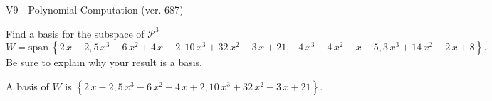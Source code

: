 \begin{exercise}
  \begin{exerciseTitle}V9 - Polynomial Computation (ver. 687)\end{exerciseTitle}
  \begin{exerciseStatement}
    Find a basis for the subspace of \(\mathcal{P}^3\) 
\[W=\mathrm{span}\ \left\{2 \, x - 2 , 5 \, x^{3} - 6 \, x^{2} + 4 \, x + 2 , 10 \, x^{3} + 32 \, x^{2} - 3 \, x + 21 , -4 \, x^{3} - 4 \, x^{2} - x - 5 , 3 \, x^{3} + 14 \, x^{2} - 2 \, x + 8\right\}.\]
 Be sure to explain why your result is a basis.


  \end{exerciseStatement}
  \begin{exerciseAnswer}
   A basis of \(W\) is  \(\left\{2 \, x - 2 , 5 \, x^{3} - 6 \, x^{2} + 4 \, x + 2 , 10 \, x^{3} + 32 \, x^{2} - 3 \, x + 21\right\}\).
  


  \end{exerciseAnswer}
\end{exercise}